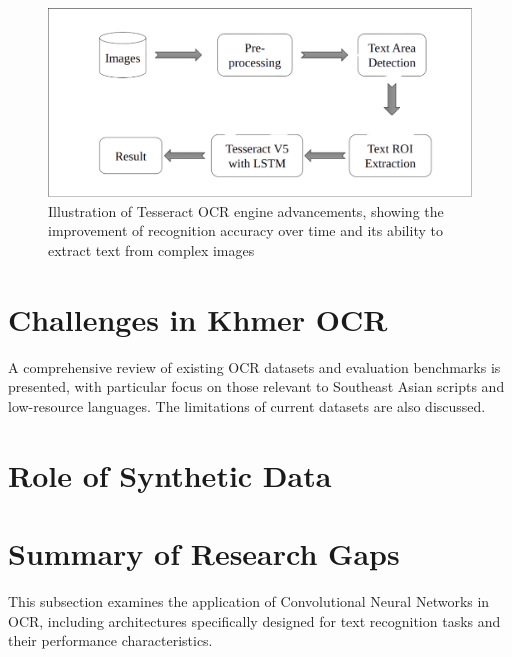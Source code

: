\begin{figure}[ht]
    \centering
    \includegraphics[width=\textwidth]{figures/Tesseract.png}
    \caption{Illustration of Tesseract OCR engine advancements, showing the improvement 
    of recognition accuracy over time and its ability to extract text from complex images}
    \label{fig:tesseract_advancements}
\end{figure}



\section{Challenges in Khmer OCR}
\label{sec:datasets}
A comprehensive review of existing OCR datasets and evaluation benchmarks is presented, with particular focus on those relevant to Southeast Asian scripts and low-resource languages. The limitations of current datasets are also discussed.

\section{Role of Synthetic Data}
\label{sec:dl-models}

\section{Summary of Research Gaps }
\label{sec:cnn}
This subsection examines the application of Convolutional Neural Networks in OCR, including architectures specifically designed for text recognition tasks and their performance characteristics.
